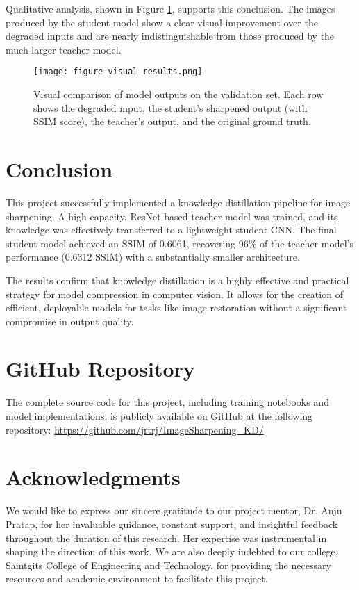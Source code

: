 \documentclass[12pt,a4paper]{article}
\begin{document}
Qualitative analysis, shown in Figure \ref{fig:visual_results}, supports this conclusion. The images produced by the student model show a clear visual improvement over the degraded inputs and are nearly indistinguishable from those produced by the much larger teacher model.

\begin{figure}[htbp]
    \centering
    \texttt{[image: figure\_visual\_results.png]}
    \caption{Visual comparison of model outputs on the validation set. Each row shows the degraded input, the student's sharpened output (with SSIM score), the teacher's output, and the original ground truth.}
    \label{fig:visual_results}
\end{figure}

\newpage
\section{Conclusion}
This project successfully implemented a knowledge distillation pipeline for image sharpening. A high-capacity, ResNet-based teacher model was trained, and its knowledge was effectively transferred to a lightweight student CNN. The final student model achieved an SSIM of 0.6061, recovering 96\% of the teacher model's performance (0.6312 SSIM) with a substantially smaller architecture.

The results confirm that knowledge distillation is a highly effective and practical strategy for model compression in computer vision. It allows for the creation of efficient, deployable models for tasks like image restoration without a significant compromise in output quality.

\newpage
\section*{GitHub Repository}
The complete source code for this project, including training notebooks and model implementations, is publicly available on GitHub at the following repository:
\url{https://github.com/jrtrj/ImageSharpening_KD/}

\vspace{1cm}

\section*{Acknowledgments}
We would like to express our sincere gratitude to our project mentor, Dr. Anju Pratap, for her invaluable guidance, constant support, and insightful feedback throughout the duration of this research. Her expertise was instrumental in shaping the direction of this work. We are also deeply indebted to our college, Saintgits College of Engineering and Technology, for providing the necessary resources and academic environment to facilitate this project.
\end{document}
